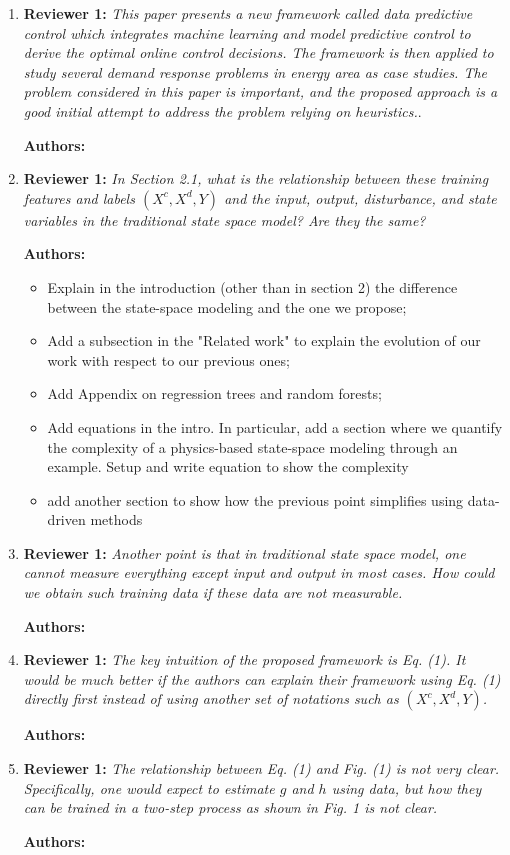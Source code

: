 \documentclass{article}
\begin{document}
\begin{enumerate}
\item \textbf{Reviewer 1:} \textit{This paper presents a new framework called data predictive control which integrates machine learning and model predictive control to derive the optimal online control decisions. The framework is then applied to study several demand response problems in energy area as case studies. The problem considered in this paper is important, and the proposed approach is a good initial attempt to address the problem relying on heuristics.}.

\textbf{Authors:} 

\item \textbf{Reviewer 1:} \textit{In Section 2.1, what is the relationship between these training features and labels $(X^c, X^d, Y)$ and the input, output, disturbance, and state variables in the traditional state space model? Are they the same?}

\textbf{Authors:} 
	\begin{itemize}
		\item Explain in the introduction (other than in section 2) the difference between the state-space modeling and the one we propose;
		\item Add a subsection in the "Related work" to explain the evolution of our work with respect to our previous ones;
		\item Add Appendix on regression trees and random forests;
		\item Add equations in the intro. In particular, add a section where we quantify the complexity of a physics-based state-space modeling through an example. Setup and write equation to show the complexity
		\item add another section to show how the previous point simplifies using data-driven methods
	\end{itemize}

\item \textbf{Reviewer 1:} \textit{Another point is that in traditional state space model, one cannot measure everything except input and output in most cases. How could we obtain such training data if these data are not measurable.}

\textbf{Authors:} 

\item \textbf{Reviewer 1:} \textit{The key intuition of the proposed framework is Eq. (1). It would be much better if the authors can explain their framework using Eq. (1) directly first instead of using another set of notations such as $(X^c, X^d, Y)$.}

\textbf{Authors:} 

\item \textbf{Reviewer 1:} \textit{The relationship between Eq. (1) and Fig. (1) is not very clear. Specifically, one would expect to estimate $g$ and $h$ using data, but how they can be trained in a two-step process as shown in Fig. 1 is not clear.}

\textbf{Authors:} 

\end{enumerate}
\end{document}
